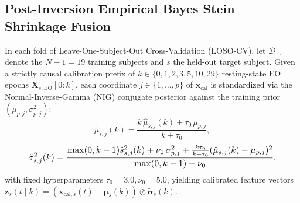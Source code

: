 \documentclass[10pt,twocolumn]{article}
\begin{document}
\subsection{Post-Inversion Empirical Bayes Stein Shrinkage Fusion}
In each fold of Leave-One-Subject-Out Cross-Validation (LOSO-CV), let $\mathcal{D}_{-s}$ denote the $N-1 = 19$ training subjects and $s$ the held-out target subject. Given a strictly causal calibration prefix of $k \in \{0,1,2,3,5,10,29\}$ resting-state $\mathrm{EO}$ epochs $\mathbf{X}_{s,\mathrm{EO}}[0:k]$, each coordinate $j \in \{1,\dots,p\}$ of $\mathbf{x}_{\mathrm{cal}}$ is standardized via the Normal-Inverse-Gamma (NIG) conjugate posterior against the training prior $(\mu_{p,j}, \sigma_{p,j}^2)$:
\begin{equation}
    \tilde{\mu}_{s,j}(k) = \frac{k\,\hat{\mu}_{s,j}(k) + \tau_0\,\mu_{p,j}}{k + \tau_0},
\end{equation}
\begin{equation}
\resizebox{0.88\columnwidth}{!}{$\displaystyle
    \tilde{\sigma}_{s,j}^2(k) = \frac{\max(0, k-1)\hat{s}_{s,j}^2(k) + \nu_0\,\sigma_{p,j}^2 + \frac{k\tau_0}{k+\tau_0}(\hat{\mu}_{s,j}(k)-\mu_{p,j})^2}{\max(0, k-1) + \nu_0},
$}
\end{equation}
with fixed hyperparameters $\tau_0 = 3.0, \nu_0 = 5.0$, yielding calibrated feature vectors $\mathbf{z}_s(t \mid k) = (\mathbf{x}_{\mathrm{cal},s}(t) - \tilde{\boldsymbol{\mu}}_s(k)) \oslash \tilde{\boldsymbol{\sigma}}_s(k)$.
\end{document}
